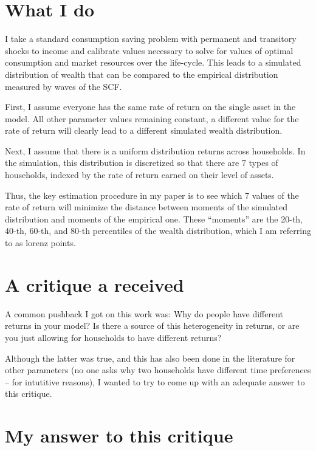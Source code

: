 \documentclass{article}
\newcommand{\say}[1]{``#1''}
\begin{document}
\section{What I do}

\par I take a standard consumption saving problem with permanent and transitory shocks to income and calibrate values necessary to solve for values of optimal consumption and market resources over the life-cycle. This leads to a simulated distribution of wealth that can be compared to the empirical distribution measured by waves of the SCF.

\par First, I assume everyone has the same rate of return on the single asset in the model. All other parameter values remaining constant, a different value for the rate of return will clearly lead to a different simulated wealth distribution. 

\par Next, I assume that there is a uniform distribution returns across households. In the simulation, this distribution is discretized so that there are 7 types of households, indexed by the rate of return earned on their level of assets. 

\par Thus, the key estimation procedure in my paper is to see which 7 values of the rate of return will minimize the distance between moments of the simulated distribution and moments of the empirical one. These \say{moments} are the 20-th, 40-th, 60-th, and 80-th percentiles of the wealth distribution, which I am referring to as lorenz points.

\section{A critique a received}

\par A common pushback I got on this work was: Why do people have different returns in your model? Is there a source of this heterogeneity in returns, or are you just allowing for households to have different returns?

\par Although the latter was true, and this has also been done in the literature for other parameters (no one asks why two households have different time preferences -- for intutitive reasons), I wanted to try to come up with an adequate answer to this critique.

\section{My answer to this critique}
\end{document}
